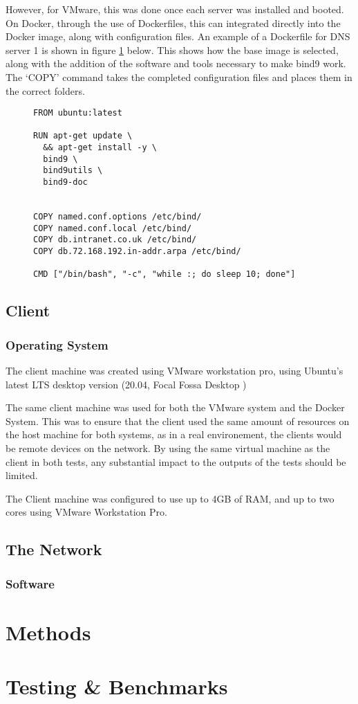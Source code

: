 However, for VMware, this was done once each server was installed and booted. On Docker, through the use of Dockerfiles, this can integrated directly into the Docker image, along with configuration files. An example of a Dockerfile for DNS server 1 is shown in figure \ref{fig:dockerfileexample} below. This shows how the base image is selected, along with the addition of the software and tools necessary to make bind9 work. The `COPY' command takes the completed configuration files and places them in the correct folders.
\begin{figure}[h]
\caption{}
\label{fig:dockerfileexample}
\begin{verbatim}
FROM ubuntu:latest

RUN apt-get update \
  && apt-get install -y \
  bind9 \
  bind9utils \
  bind9-doc


COPY named.conf.options /etc/bind/
COPY named.conf.local /etc/bind/
COPY db.intranet.co.uk /etc/bind/
COPY db.72.168.192.in-addr.arpa /etc/bind/

CMD ["/bin/bash", "-c", "while :; do sleep 10; done"]

\end{verbatim}

\end{figure}

\section{Client}
\subsection{Operating System}
The client machine was created using VMware workstation pro, using Ubuntu's latest LTS desktop version (20.04, Focal Fossa Desktop \citep{UbuntuDesktopDocumentation})

The same client machine was used for both the VMware system and the Docker System. This was to ensure that the client used the same amount of resources on the host machine for both systems, as in a real environement, the clients would be remote devices on the network. By using the same virtual machine as the client in both tests, any substantial impact to the outputs of the tests should be limited.

The Client machine was configured to use up to 4GB of RAM, and up to two cores using VMware Workstation Pro.

\section{The Network}

\subsection{Software}

\chapter{Methods}

\chapter{Testing \& Benchmarks}

